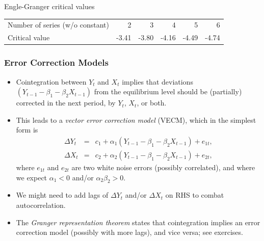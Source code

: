 \begin{frame}
\begin{block}{Engle-Granger critical values}
\begin{tabular}{l|rrrrr}
\toprule
Number of series (w/o constant)&2&3&4&5&6\\
Critical value &-3.41 &-3.80 &-4.16&-4.49&-4.74\\
\bottomrule
\end{tabular}
\end{block}
\end{frame}
\begin{frame}%

\frametitle{Error Correction Models}

\begin{itemize}
\item Cointegration between $Y_{t}$ and $X_{t}$ implies that deviations $%
(Y_{t-1}-\beta _{1}-\beta _{2}X_{t-1})$ from the equilibrium level should be
(partially) corrected in the next period, by $Y_{t}$, $X_{t}$, or both.

\item This leads to a \emph{\color{red}vector error correction model}
(VECM), which in the simplest form is%
\begin{eqnarray*}
\Delta Y_{t} &=&c_1+\alpha _{1}(Y_{t-1}-\beta _{1}-\beta _{2}X_{t-1})+e_{1t}, \\
\Delta X_{t} &=&c_2+\alpha _{2}(Y_{t-1}-\beta _{1}-\beta _{2}X_{t-1})+e_{2t},
\end{eqnarray*}%
where $e_{1t}$ and $e_{2t}$ are two white noise errors (possibly
correlated), and where we expect $\alpha _{1}<0$ and/or $\alpha _{2}\beta
_{2}>0$.
\item We might need to add lags of $\Delta Y_{t}$ and/or $\Delta X_{t}$ on RHS to combat autocorrelation.
\item The \emph{\color{red}Granger representation theorem} states that
cointegration implies an error correction model (possibly with more lags),
and vice versa; see exercises.
\end{itemize}

\end{frame}%

